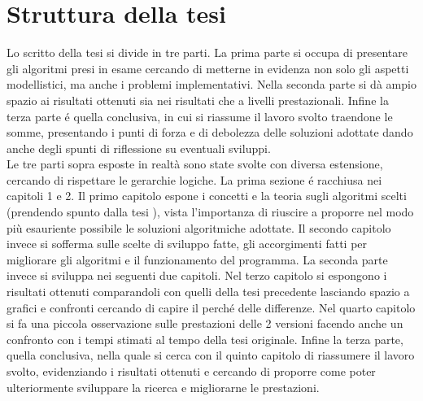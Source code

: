 \section{Struttura della tesi}
Lo scritto della tesi si divide in tre parti.
La prima parte si occupa di presentare gli algoritmi presi in esame cercando di metterne in evidenza
non solo gli aspetti modellistici, ma anche i problemi implementativi.
Nella seconda parte si d\`a ampio spazio ai risultati ottenuti sia nei risultati che a livelli
prestazionali.
Infine la terza parte \'e quella conclusiva, in cui si riassume il lavoro svolto traendone
le somme, presentando i punti di forza e di debolezza delle soluzioni
adottate dando anche degli spunti di riflessione su eventuali sviluppi.\\

Le tre parti sopra esposte in realt\`a sono state svolte con diversa estensione,
cercando di rispettare le gerarchie logiche.
La prima sezione \'e racchiusa nei capitoli 1 e 2.
Il primo capitolo espone i concetti e la teoria sugli algoritmi scelti (prendendo spunto
dalla tesi \cite{cit_49}), vista l'importanza di riuscire a proporre nel
modo pi\`u esauriente possibile le soluzioni algoritmiche adottate. Il secondo
capitolo invece si sofferma sulle scelte di sviluppo fatte, gli accorgimenti
fatti per migliorare gli algoritmi e il funzionamento del programma.
La seconda parte invece si sviluppa nei seguenti due capitoli.
Nel terzo capitolo si espongono i risultati ottenuti comparandoli con quelli
della tesi precedente lasciando spazio a grafici e confronti cercando
di capire il perch\'e delle differenze.
Nel quarto capitolo si fa una piccola osservazione sulle prestazioni delle 2 versioni
facendo anche un confronto con i tempi stimati al tempo della tesi originale.
Infine la terza parte, quella conclusiva, nella quale si cerca con il quinto capitolo
di riassumere il lavoro svolto, evidenziando i risultati ottenuti e cercando
di proporre come poter ulteriormente sviluppare la ricerca e migliorarne le prestazioni.
